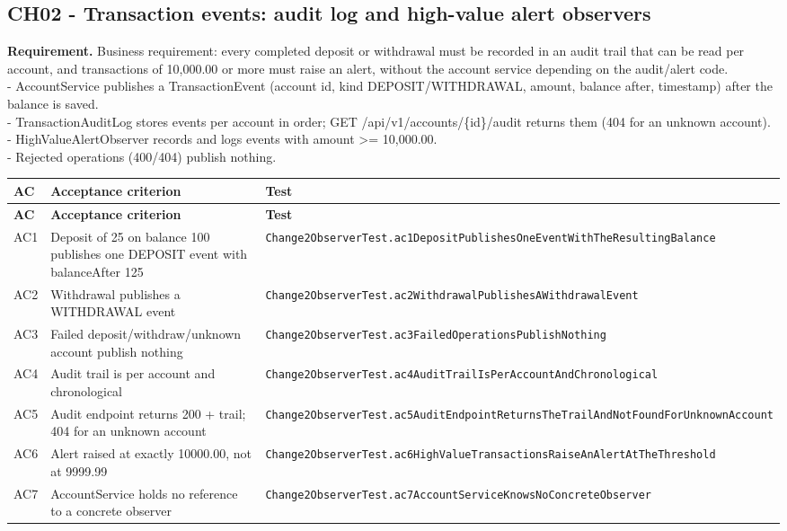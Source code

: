 \documentclass[11pt,a4paper]{article}
\begin{document}
\subsection{CH02 - Transaction events: audit log and high-value alert observers}
\textbf{Requirement.} Business requirement: every completed deposit or withdrawal must be recorded in an audit trail that can be read per account, and transactions of 10,000.00 or more must raise an alert, without the account service depending on the audit/alert code.\\ - AccountService publishes a TransactionEvent (account id, kind DEPOSIT/WITHDRAWAL, amount, balance after, timestamp) after the balance is saved.\\ - TransactionAuditLog stores events per account in order; GET /api/v1/accounts/\{id\}/audit returns them (404 for an unknown account).\\ - HighValueAlertObserver records and logs events with amount \textgreater{}= 10,000.00.\\ - Rejected operations (400/404) publish nothing.
{\footnotesize
\begin{longtable}{@{}p{1cm}p{7.6cm}p{7cm}@{}}
\toprule \textbf{AC} & \textbf{Acceptance criterion} & \textbf{Test} \\ \midrule \endfirsthead
\toprule \textbf{AC} & \textbf{Acceptance criterion} & \textbf{Test} \\ \midrule \endhead
\bottomrule \endfoot
AC1 & Deposit of 25 on balance 100 publishes one DEPOSIT event with balanceAfter 125 & \texttt{Change2ObserverTest.\allowbreak{}ac1DepositPublishesOneEventWithTheResultingBalance} \\
AC2 & Withdrawal publishes a WITHDRAWAL event & \texttt{Change2ObserverTest.\allowbreak{}ac2WithdrawalPublishesAWithdrawalEvent} \\
AC3 & Failed deposit/withdraw/unknown account publish nothing & \texttt{Change2ObserverTest.\allowbreak{}ac3FailedOperationsPublishNothing} \\
AC4 & Audit trail is per account and chronological & \texttt{Change2ObserverTest.\allowbreak{}ac4AuditTrailIsPerAccountAndChronological} \\
AC5 & Audit endpoint returns 200 + trail; 404 for an unknown account & \texttt{Change2ObserverTest.\allowbreak{}ac5AuditEndpointReturnsTheTrailAndNotFoundForUnknownAccount} \\
AC6 & Alert raised at exactly 10000.00, not at 9999.99 & \texttt{Change2ObserverTest.\allowbreak{}ac6HighValueTransactionsRaiseAnAlertAtTheThreshold} \\
AC7 & AccountService holds no reference to a concrete observer & \texttt{Change2ObserverTest.\allowbreak{}ac7AccountServiceKnowsNoConcreteObserver} \\
\end{longtable}
}
\end{document}
